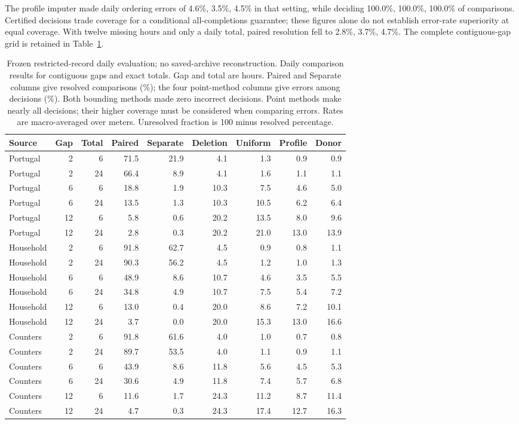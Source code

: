 \documentclass[12pt]{article}
\begin{document}
The profile imputer made daily ordering errors of
4.6\%, 3.5\%, 4.5\% in that setting, while deciding
100.0\%, 100.0\%, 100.0\% of comparisons.
Certified decisions trade coverage for a conditional all-completions
guarantee; these figures alone do not establish error-rate superiority
at equal coverage. With twelve missing hours and only a daily total,
paired resolution fell to 2.8\%, 3.7\%, 4.7\%.
The complete contiguous-gap grid is retained in Table~\ref{tab:daily}.
\begin{table}[htbp]
\centering\normalsize\setlength{\tabcolsep}{4pt}
\caption{Frozen restricted-record daily evaluation; no saved-archive reconstruction. Daily comparison results for contiguous gaps and exact totals. Gap and total are hours. Paired and Separate columns give resolved comparisons (\%); the four point-method columns give errors among decisions (\%). Both bounding methods made zero incorrect decisions. Point methods make nearly all decisions; their higher coverage must be considered when comparing errors. Rates are macro-averaged over meters. Unresolved fraction is 100 minus resolved percentage.}
\label{tab:daily}
\begin{tabular}{lrrrrrrrr}
\toprule
Source & Gap & Total & Paired & Separate & Deletion & Uniform & Profile & Donor\\
\midrule
Portugal & 2 & 6 & 71.5 & 21.9 & 4.1 & 1.3 & 0.9 & 0.9\\
Portugal & 2 & 24 & 66.4 & 8.9 & 4.1 & 1.6 & 1.1 & 1.1\\
Portugal & 6 & 6 & 18.8 & 1.9 & 10.3 & 7.5 & 4.6 & 5.0\\
Portugal & 6 & 24 & 13.5 & 1.3 & 10.3 & 10.5 & 6.2 & 6.4\\
Portugal & 12 & 6 & 5.8 & 0.6 & 20.2 & 13.5 & 8.0 & 9.6\\
Portugal & 12 & 24 & 2.8 & 0.3 & 20.2 & 21.0 & 13.0 & 13.9\\
Household & 2 & 6 & 91.8 & 62.7 & 4.5 & 0.9 & 0.8 & 1.1\\
Household & 2 & 24 & 90.3 & 56.2 & 4.5 & 1.2 & 1.0 & 1.3\\
Household & 6 & 6 & 48.9 & 8.6 & 10.7 & 4.6 & 3.5 & 5.5\\
Household & 6 & 24 & 34.8 & 4.9 & 10.7 & 7.5 & 5.4 & 7.2\\
Household & 12 & 6 & 13.0 & 0.4 & 20.0 & 8.6 & 7.2 & 10.1\\
Household & 12 & 24 & 3.7 & 0.0 & 20.0 & 15.3 & 13.0 & 16.6\\
Counters & 2 & 6 & 91.8 & 61.6 & 4.0 & 1.0 & 0.7 & 0.8\\
Counters & 2 & 24 & 89.7 & 53.5 & 4.0 & 1.1 & 0.9 & 1.1\\
Counters & 6 & 6 & 43.9 & 8.6 & 11.8 & 5.6 & 4.5 & 5.3\\
Counters & 6 & 24 & 30.6 & 4.9 & 11.8 & 7.4 & 5.7 & 6.8\\
Counters & 12 & 6 & 11.6 & 1.7 & 24.3 & 11.2 & 8.7 & 11.4\\
Counters & 12 & 24 & 4.7 & 0.3 & 24.3 & 17.4 & 12.7 & 16.3\\
\bottomrule
\end{tabular}
\end{table}
\end{document}
